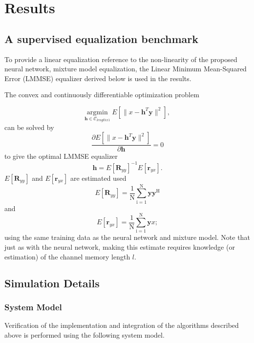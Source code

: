 \documentclass[12pt,a4paper]{article}
\begin{document}
\section{Results}
\subsection{A supervised equalization benchmark}
To provide a linear equalization reference to the non-linearity of the proposed neural network, mixture model equalization, the Linear Minimum Mean-Squared Error (LMMSE) equalizer derived below is used in the results. 
\par
The convex and continuously differentiable optimization problem 

\begin{equation*}\label{mmse}
\underset{\mathbf{\mathbf{h}} \in \textit{$\mathcal{C}_{lengthx1}$}}{\text{argmin}} \;
 E[\|x-\mathbf{h}^T\mathbf{y}\|^2],
\end{equation*}
can be solved by 
\begin{equation*}\label{mmse}
\frac{\partial  E[\|x-\mathbf{h}^T\mathbf{y}\|^2]}{\partial \mathbf{h} } = 0
\end{equation*}
to give the optimal LMMSE equalizer
\begin{equation*}\label{mmse}
\mathbf{h} = E[\mathbf{R}_{yy}]^{-1}E[\mathbf{r}_{yx}].
\end{equation*}
$E[\mathbf{R}_{yy}]$ and $E[\mathbf{r}_{yx}]$ are estimated used
\begin{equation*}\label{mmse}
 E[\mathbf{R}_{yy}]= \frac{1}{\mathrm{N}}\sum_{\mathrm{i=1}}^{\mathrm{N}}
\mathbf{y}\mathbf{y^{\mathrm{H}}} 
 \end{equation*}
 and
\begin{equation*}\label{mmse}
E[\mathbf{r}_{yx}]= \frac{1}{\mathrm{N}}\sum_{\mathrm{i=1}}^{\mathrm{N}}
\mathbf{y}x
;
 \end{equation*}
 using the same training data as the neural network and mixture model. 
Note that just as with the neural network, making this estimate requires knowledge (or estimation) of the channel memory length $l$.


\subsection{Simulation Details}
\subsubsection{System Model}
Verification of the implementation and integration of the algorithms described above is performed using the following system model.
\end{document}

